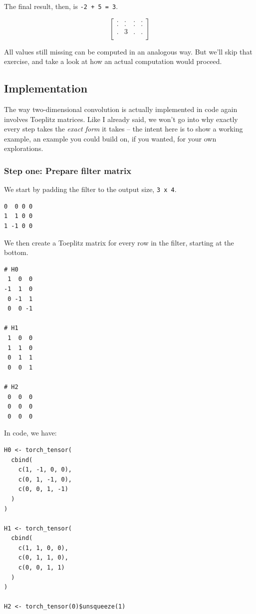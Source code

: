 \documentclass[
  letterpaper,
]{krantz}
\begin{document}
The final result, then, is \texttt{-2\ +\ 5\ =\ 3}.

\[
\begin{bmatrix}
  . & . & . & .\\
  . & . & . & .\\
  . & 3 & . & .\\
\end{bmatrix}
\]

All values still missing can be computed in an analogous way. But we'll
skip that exercise, and take a look at how an actual computation would
proceed.

\hypertarget{implementation-2}{%
\subsection{Implementation}\label{implementation-2}}

The way two-dimensional convolution is actually implemented in code
again involves Toeplitz matrices. Like I already said, we won't go into
why exactly every step takes the \emph{exact form} it takes -- the
intent here is to show a working example, an example you could build on,
if you wanted, for your own explorations.

\hypertarget{step-one-prepare-filter-matrix}{%
\subsubsection{Step one: Prepare filter
matrix}\label{step-one-prepare-filter-matrix}}

We start by padding the filter to the output size, \texttt{3\ x\ 4}.

\begin{verbatim}
0  0 0 0
1  1 0 0
1 -1 0 0
\end{verbatim}

We then create a Toeplitz matrix for every row in the filter, starting
at the bottom.

\begin{verbatim}
# H0
 1  0  0  
-1  1  0  
 0 -1  1  
 0  0 -1  
 
# H1
 1  0  0  
 1  1  0  
 0  1  1  
 0  0  1  
 
# H2
 0  0  0  
 0  0  0  
 0  0  0  
\end{verbatim}

In code, we have:

\begin{verbatim}
H0 <- torch_tensor(
  cbind(
    c(1, -1, 0, 0),
    c(0, 1, -1, 0),
    c(0, 0, 1, -1)
  )
)

H1 <- torch_tensor(
  cbind(
    c(1, 1, 0, 0),
    c(0, 1, 1, 0),
    c(0, 0, 1, 1)
  )
)

H2 <- torch_tensor(0)$unsqueeze(1)
\end{verbatim}
\end{document}
